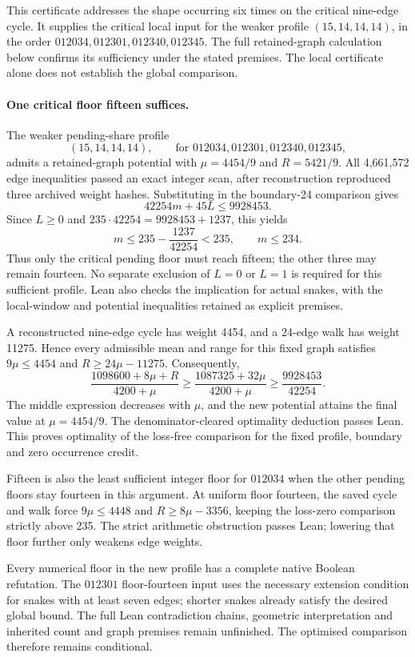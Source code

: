 \documentclass[11pt,a4paper]{article}
\theoremstyle{definition}
\theoremstyle{remark}
\begin{document}
This certificate addresses the shape occurring six times on the critical
nine-edge cycle. It supplies the critical local input for the weaker profile $(15,14,14,14)$,
in the order $012034,012301,012340,012345$. The full retained-graph calculation below confirms its sufficiency
under the stated premises. The local certificate alone does not
establish the global comparison.

\paragraph{One critical floor fifteen suffices.}
The weaker pending-share profile
\[
(15,14,14,14),\qquad\text{for }012034,012301,012340,012345,
\]
admits a retained-graph potential with $\mu=4454/9$ and $R=5421/9$.
All 4,661,572 edge inequalities passed an exact integer scan, after
reconstruction reproduced three archived weight hashes. Substituting
in the boundary-24 comparison gives
\[
\boxed{42254m+45L\le9928453.}
\]
Since $L\ge0$ and $235\cdot42254=9928453+1237$, this yields
\[
m\le235-\frac{1237}{42254}<235,\qquad m\le234.
\]
Thus only the critical pending floor must reach fifteen; the other three
may remain fourteen. No separate exclusion of $L=0$ or $L=1$ is required
for this sufficient profile. Lean also checks the implication for actual snakes, with the local-window
and potential inequalities retained as explicit premises.

A reconstructed nine-edge cycle has weight 4454, and a 24-edge walk has
weight 11275. Hence every admissible mean and range for this fixed graph
satisfies $9\mu\le4454$ and $R\ge24\mu-11275$. Consequently,
\[
\frac{1098600+8\mu+R}{4200+\mu}
\ge\frac{1087325+32\mu}{4200+\mu}
\ge\frac{9928453}{42254}.
\]
The middle expression decreases with $\mu$, and the new potential attains
the final value at $\mu=4454/9$. The denominator-cleared optimality
deduction passes Lean. This proves optimality of the loss-free comparison
for the fixed profile, boundary and zero occurrence credit.

Fifteen is also the least sufficient integer floor for $012034$ when the
other pending floors stay fourteen in this argument. At uniform floor
fourteen, the saved cycle and walk force $9\mu\le4448$ and
$R\ge8\mu-3356$, keeping the loss-zero comparison strictly above 235.
The strict arithmetic obstruction passes Lean; lowering that floor further
only weakens edge weights.

Every numerical floor in the new profile has a complete native Boolean
refutation. The $012301$ floor-fourteen input uses the necessary extension
condition for snakes with at least seven edges; shorter snakes already
satisfy the desired global bound. The full Lean contradiction chains,
geometric interpretation and inherited count and graph premises remain
unfinished. The optimised comparison therefore remains conditional.
\end{document}
